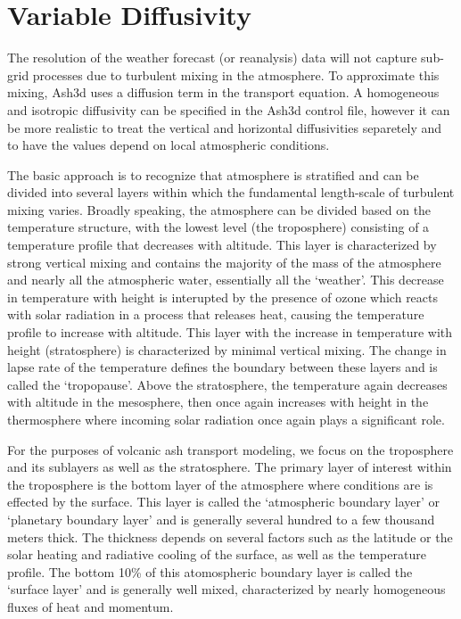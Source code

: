 \chapter{Variable Diffusivity}\label{ChapAppendVarDiff}
The resolution of the weather forecast (or reanalysis) data will not capture sub-grid
processes due to turbulent mixing in the atmosphere. To approximate this mixing, Ash3d
uses a diffusion term in the transport equation. A homogeneous and isotropic diffusivity
can be specified in the Ash3d control file, however it can be more realistic to 
treat the vertical and horizontal diffusivities separetely and to have the values
depend on local atmospheric conditions.

The basic approach is to recognize that atmosphere is stratified and can be divided into
several layers within which the fundamental length-scale of turbulent mixing varies.
Broadly speaking, the atmosphere can be divided based on the temperature structure,
with the lowest level (the troposphere) consisting of a temperature profile that
decreases with altitude. This layer is characterized by strong vertical mixing and
contains the majority of the mass of the atmosphere and nearly all the atmospheric
water, essentially all the `weather'. This decrease in temperature with height is
interupted by the presence of ozone which reacts with solar radiation in a process that
releases heat, causing the temperature profile to increase with altitude. This layer
with the increase in temperature with height (stratosphere) is characterized by
minimal vertical mixing.
The change in lapse rate of the temperature defines the boundary between these layers
and is called the `tropopause'. Above the stratosphere, the temperature again decreases with
altitude in the mesosphere, then once again increases with height in the thermosphere
where incoming solar radiation once again plays a significant role.

For the purposes of volcanic ash transport modeling, we focus on the troposphere and
its sublayers as well as the stratosphere.
The primary layer of interest within the troposphere is the bottom layer
of the atmosphere where conditions are 
is effected by the surface. This layer is called the `atmospheric boundary layer' or
`planetary boundary layer' and is generally several hundred to a few thousand meters thick.
The thickness depends on several factors such as the latitude or the solar heating and
radiative cooling of the surface, as well as the temperature profile.
The bottom 10\% of this atomospheric boundary layer is called the `surface layer' and 
is generally well mixed, characterized by nearly homogeneous fluxes of heat and momentum.

